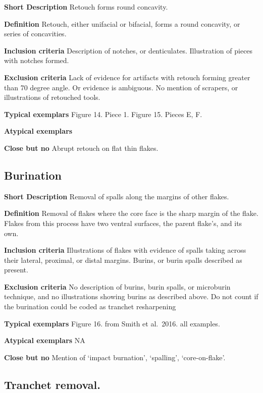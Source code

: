 \documentclass[
]{article}
\begin{document}
\textbf{Short Description} Retouch forms round concavity.

\textbf{Definition} Retouch, either unifacial or bifacial, forms a round
concavity, or series of concavities.

\textbf{Inclusion criteria} Description of notches, or denticulates.
Illustration of pieces with notches formed.

\textbf{Exclusion criteria} Lack of evidence for artifacts with retouch
forming greater than 70 degree angle. Or evidence is ambiguous. No
mention of scrapers, or illustrations of retouched tools.

\textbf{Typical exemplars} Figure 14. Piece 1. Figure 15. Pieces E, F.

\textbf{Atypical exemplars}

\textbf{Close but no} Abrupt retouch on flat thin flakes.

\hypertarget{burination}{%
\subsection{Burination}\label{burination}}

\textbf{Short Description} Removal of spalls along the margins of other
flakes.

\textbf{Definition} Removal of flakes where the core face is the sharp
margin of the flake. Flakes from this process have two ventral surfaces,
the parent flake's, and its own.

\textbf{Inclusion criteria} Illustrations of flakes with evidence of
spalls taking across their lateral, proximal, or distal margins. Burins,
or burin spalls described as present.

\textbf{Exclusion criteria} No description of burins, burin spalls, or
microburin technique, and no illustrations showing burins as described
above. Do not count if the burination could be coded as tranchet
resharpening

\textbf{Typical exemplars} Figure 16. from Smith et al.~2016. all
examples.

\textbf{Atypical exemplars} NA

\textbf{Close but no} Mention of `impact burnation', `spalling',
`core-on-flake'.

\hypertarget{tranchet-removal.}{%
\subsection{Tranchet removal.}\label{tranchet-removal.}}
\end{document}
